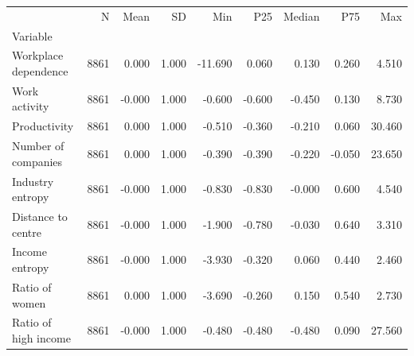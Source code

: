 \begin{tabular}{lrrrrrrrr}
\toprule
 & N & Mean & SD & Min & P25 & Median & P75 & Max \\
Variable &  &  &  &  &  &  &  &  \\
\midrule
Workplace dependence & 8861 & 0.000 & 1.000 & -11.690 & 0.060 & 0.130 & 0.260 & 4.510 \\
Work activity & 8861 & -0.000 & 1.000 & -0.600 & -0.600 & -0.450 & 0.130 & 8.730 \\
Productivity & 8861 & 0.000 & 1.000 & -0.510 & -0.360 & -0.210 & 0.060 & 30.460 \\
Number of companies & 8861 & 0.000 & 1.000 & -0.390 & -0.390 & -0.220 & -0.050 & 23.650 \\
Industry entropy & 8861 & -0.000 & 1.000 & -0.830 & -0.830 & -0.000 & 0.600 & 4.540 \\
Distance to centre & 8861 & -0.000 & 1.000 & -1.900 & -0.780 & -0.030 & 0.640 & 3.310 \\
Income entropy & 8861 & -0.000 & 1.000 & -3.930 & -0.320 & 0.060 & 0.440 & 2.460 \\
Ratio of women & 8861 & 0.000 & 1.000 & -3.690 & -0.260 & 0.150 & 0.540 & 2.730 \\
Ratio of high income & 8861 & -0.000 & 1.000 & -0.480 & -0.480 & -0.480 & 0.090 & 27.560 \\
\bottomrule
\end{tabular}

